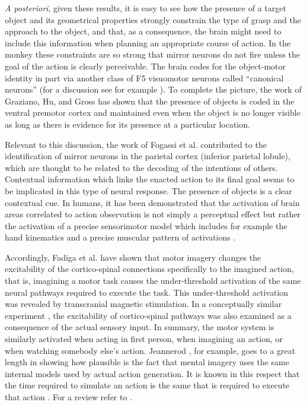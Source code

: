 {\em A posteriori}, given these results, it is easy to see how the
presence of a target object and its geometrical properties strongly
constrain the type of grasp and the approach to the object, and that,
as a consequence, the brain might need to include this information
when planning an appropriate course of action. In the monkey these
constraints are so strong that mirror neurons do not fire unless the
goal of the action is clearly perceivable. The brain codes for the
object-motor identity in part via another class of F5 visuomotor
neurons called ``canonical neurons'' (for a discussion see for example
\cite{metta-06}). To complete the picture, the work of Graziano,
Hu, and Gross \cite{graziano-97} has shown that the presence of
objects is coded in the ventral premotor cortex and maintained even
when the object is no longer visible as long as there is evidence for
its presence at a particular location.

Relevant to this discussion, the work of Fogassi et
al. \cite{fogassi-05} contributed to the identification of mirror
neurons in the parietal cortex (inferior parietal lobule), which are
thought to be related to the decoding of the intentions of
others. Contextual information which links the enacted action to its
final goal seems to be implicated in this type of neural response. The
presence of objects is a clear contextual cue. In humans, it has been
demonstrated that the activation of brain areas correlated to action
observation is not simply a perceptual effect but rather the
activation of a precise sensorimotor model which includes for example
the hand kinematics \cite{pozzo-06} and a precise muscular pattern of
activations \cite{borroni-05}.
 
Accordingly, Fadiga et al. \cite{fadiga-99,vargas-04} have shown that
motor imagery changes the excitability of the cortico-spinal
connections specifically to the imagined action, that is, imagining a
motor task causes the under-threshold activation of the same neural
pathways required to execute the task. This under-threshold activation
was revealed by transcranial magnetic stimulation. In a conceptually
similar experiment \cite{fadiga-05}, the excitability of
cortico-spinal pathways was also examined as a consequence of the
actual sensory input. In summary, the motor system is similarly
activated when acting in first person, when imagining an action, or
when watching somebody else's action. Jeannerod \cite{jeannerod-88},
for example, goes to a great length in showing how plausible is the
fact that mental imagery uses the same internal models used by actual
action generation.  It is known in this respect that the time required
to simulate an action is the same that is required to execute that
action \cite{sirigu-96}. For a review refer to \cite{jeannerod-99}.

